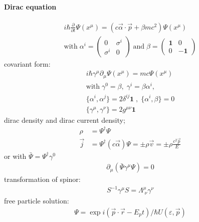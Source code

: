 \paragraph{Dirac equation}
\begin{align}
	i\hbar\frac{\partial}{\partial t}\Psi(x^\mu) = \left( c \vec{\alpha}\cdot\vec{p} + \beta m c^2 \right)\Psi(x^\mu)  \\
	\text{with}\; \alpha^i = \begin{pmatrix} 0 & \sigma^i \\ \sigma^i & 0 \end{pmatrix} \; \text{and} \; \beta = \begin{pmatrix} \mathbf{1} & 0 \\ 0 & -\mathbf{1}\end{pmatrix}
\end{align}
covariant form:
\begin{align}
	i\hbar \gamma^\mu \partial_\mu \Psi(x^\mu) = mc\Psi(x^\mu) \\
	\text{with}\; \gamma^0 = \beta, \; \gamma^i = \beta \alpha^i, \\
	\{\alpha^i, \alpha^j\} = 2 \delta^{ij}\mathbf{1} \; ,\; \{\alpha^i, \beta\} = 0 \\
	\{\gamma^\mu, \gamma^\nu \} = 2 g^{\mu \nu} \mathbf{1}
\end{align}
dirac density and dirac current density;
\begin{align}
	\rho &= \Psi^\dagger\Psi \\
	\vec{j} &= \Psi^\dagger (c\vec{\alpha}) \Psi = \pm \rho \vec{v} = \pm \rho \frac{c^2 \vec{p}}{E}
\end{align}
or with $\bar{\Psi} = \Psi^\dagger \gamma^0$
\begin{align}
	\partial_\mu (\bar{\Psi} \gamma^\mu \Psi) = 0
\end{align}
transformation of spinor:
\begin{align}
	S^{-1} \gamma^\mu S = \Lambda^\mu_{\;\nu}\gamma^\nu
\end{align}
free particle solution:
\begin{align}
	\Psi = \exp{i(\vec{p}\cdot\vec{r} - E_p t)/\hbar} U(\varepsilon, \vec{p})
\end{align}
